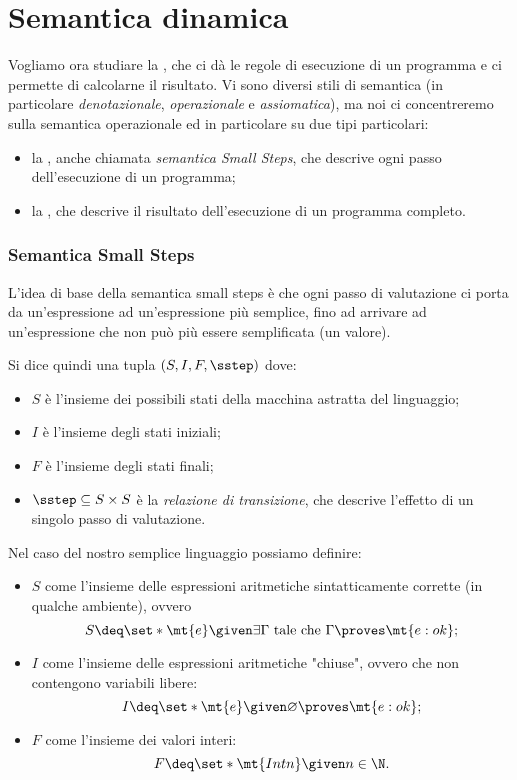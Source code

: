 \section{Semantica dinamica}

Vogliamo ora studiare la , che ci dà le regole di esecuzione di un programma e ci permette di calcolarne il risultato. Vi sono diversi stili di semantica (in particolare \emph{denotazionale}, \emph{operazionale} e \emph{assiomatica}), ma noi ci concentreremo sulla semantica operazionale ed in particolare su due tipi particolari:
\begin{itemize}
    \item la , anche chiamata \emph{semantica Small Steps}, che descrive ogni passo dell'esecuzione di un programma;
    \item la , che descrive il risultato dell'esecuzione di un programma completo.
\end{itemize}

\subsubsection{Semantica Small Steps}

L'idea di base della semantica small steps è che ogni passo di valutazione ci porta da un'espressione ad un'espressione più semplice, fino ad arrivare ad un'espressione che non può più essere semplificata (un valore).

Si dice quindi  una tupla $(S, I, F, \sstep)$ dove:
\begin{itemize}
    \item $S$ è l'insieme dei possibili stati della macchina astratta del linguaggio;
    \item $I$ è l'insieme degli stati iniziali;
    \item $F$ è l'insieme degli stati finali;
    \item $\sstep \subseteq S \times S$ è la \emph{relazione di transizione}, che descrive l'effetto di un singolo passo di valutazione.
\end{itemize}

Nel caso del nostro semplice linguaggio possiamo definire:
\begin{itemize}
    \item $S$ come l'insieme delle espressioni aritmetiche sintatticamente corrette (in qualche ambiente), ovvero \[
        S \deq \set*{\mt{e} \given \exists\Gamma \text{ tale che } \Gamma \proves \mt{e : ok}};    
    \]
    \item $I$ come l'insieme delle espressioni aritmetiche "chiuse", ovvero che non contengono variabili libere: \[
        I \deq \set*{\mt{e} \given \varnothing \proves \mt{e : ok}};    
    \]
    \item $F$ come l'insieme dei valori interi: \[
        F \deq \set*{\mt{Int n} \given n \in \N}.
    \]
\end{itemize}

